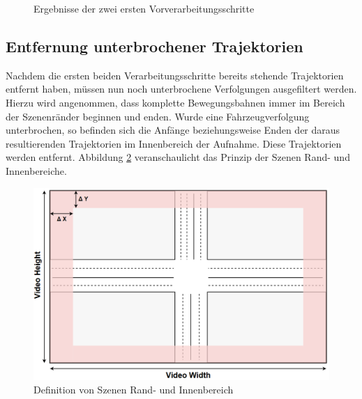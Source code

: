 \begin{figure}[H]
    \centering
    \qquad \qquad
    \caption{Ergebnisse der zwei ersten Vorverarbeitungsschritte}
    \label{fig:real_result_2nd_Prepro}
\end{figure}

\subsection{Entfernung unterbrochener Trajektorien}

Nachdem die ersten beiden Verarbeitungsschritte bereits stehende Trajektorien entfernt haben,
müssen nun noch unterbrochene Verfolgungen ausgefiltert werden. Hierzu wird angenommen, dass komplette
Bewegungsbahnen immer im Bereich der Szenenränder beginnen und enden. Wurde eine Fahrzeugverfolgung
unterbrochen, so befinden sich die Anfänge beziehungsweise Enden der daraus resultierenden Trajektorien
im Innenbereich der Aufnahme. Diese Trajektorien werden entfernt. Abbildung \ref{fig:real_completeTrajectory_Definition}
veranschaulicht das Prinzip der Szenen Rand- und Innenbereiche.

\begin{figure}[H]
\centering
    \includegraphics[width=0.5\linewidth]{../resources/img/umsetzung/U1/LaneTopo_CompleteTra}
\caption{Definition von Szenen Rand- und Innenbereich}
\label{fig:real_completeTrajectory_Definition}
\end{figure}

